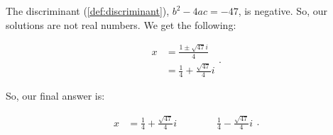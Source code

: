 \begin{note}
  \label{nte:discriminant_of_the_following_quadratic_equation}

  The discriminant (\ref{def:discriminant}), $b^{2} - 4ac = -47$, is negative.
  So, our solutions are not real numbers. We get the following:

  \begin{equation}
    \label{eqt:non_real_number_answer_for_discriminant}
    \begin{split}
      x &= \frac{1 \pm \sqrt{47}i}{4} \\
      &= \frac{1}{4} + \frac{\sqrt{47}}{4}i
    \end{split}
  .\end{equation}

  So, our final answer is:

  \begin{equation}
    \label{eqt:final_answer_for_quadratic_equation_with_non_real_answer}
    \begin{split}
      x &= \frac{1}{4} + \frac{\sqrt{47}}{4}i \qquad\qquad \frac{1}{4} - \frac{\sqrt{47}}{4}i
    \end{split}
  .\end{equation}
\end{note}

\newpage
